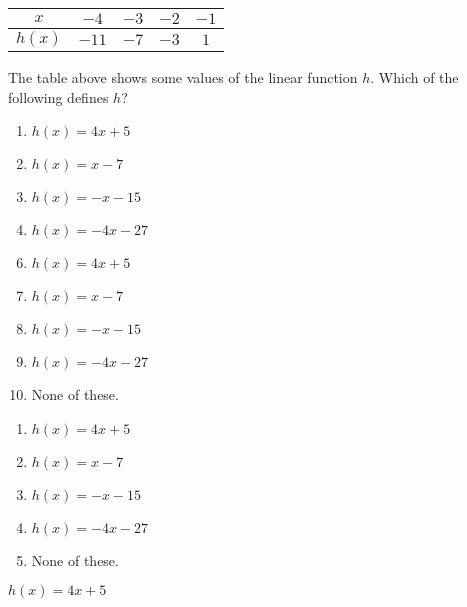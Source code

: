  \begin{center}
\begin{tabular}{|c||c|c|c|c|}\hline
$x$ & $-4$ & $-3$ & $-2$ & $-1$ \\ \hline
$h(x)$ & $-11$ & $-7$ & $-3$ & $1$ \\ \hline
\end{tabular}\end{center}
The table above shows some values of the linear function $h$.  Which of the following defines $h$?


\ifsat
	\begin{enumerate}[label=\Alph*)]
		\item $h(x)= 4x+5$ %
		\item $h(x)= x-7$ 
		\item $h(x)= -x-15$ 
		\item $h(x)= -4x-27$
	\end{enumerate}
\else
\fi

\ifacteven
	\begin{enumerate}[label=\textbf{\Alph*.},itemsep=\fill,align=left]
		\setcounter{enumii}{5}
		\item $h(x)= 4x+5$ %
		\item $h(x)= x-7$ 
		\item $h(x)= -x-15$ 
		\addtocounter{enumii}{1}
		\item $h(x)= -4x-27$
		\item None of these. 
	\end{enumerate}
\else
\fi

\ifactodd
	\begin{enumerate}[label=\textbf{\Alph*.},itemsep=\fill,align=left]
		\item $h(x)= 4x+5$ %
		\item $h(x)= x-7$ 
		\item $h(x)= -x-15$ 
		\item $h(x)= -4x-27$
		\item None of these. 
	\end{enumerate}
\else
\fi

\ifgridin
 $h(x)= 4x+5$ %
		
\else
\fi

